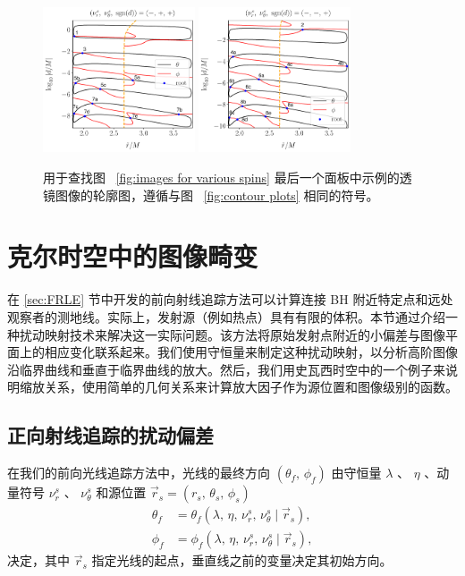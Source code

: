 \documentclass[aps,reprint,superscriptaddress,nofootinbib,floatfix,longbibliography,preprintnumbers]{revtex4-1}
\begin{document}
   \begin{figure}[!htbp]
    \centering
    \includegraphics[width=0.4\textwidth]{figures/80deg_contour_1.pdf}
    \includegraphics[width=0.4\textwidth]{figures/80deg_contour_2.pdf}
    \caption{用于查找图~    \ref{fig:images for various spins}    最后一个面板中示例的透镜图像的轮廓图，遵循与图~    \ref{fig:contour plots}    相同的符号。  }
    \label{fig:80deg contours}
\end{figure}    
   \section{克尔时空中的图像畸变  }    
   \label{sec:distortion}     

在    \ref{sec:FRLE}    节中开发的前向射线追踪方法可以计算连接 BH 附近特定点和远处观察者的测地线。实际上，发射源（例如热点）具有有限的体积。本节通过介绍一种扰动映射技术来解决这一实际问题。该方法将原始发射点附近的小偏差与图像平面上的相应变化联系起来。我们使用守恒量来制定这种扰动映射，以分析高阶图像沿临界曲线和垂直于临界曲线的放大。然后，我们用史瓦西时空中的一个例子来说明缩放关系，使用简单的几何关系来计算放大因子作为源位置和图像级别的函数。
   \subsection{正向射线追踪的扰动偏差  }     

在我们的前向光线追踪方法中，光线的最终方向    $(\theta_f,\,\phi_f)$    由守恒量    $\lambda$   、   $\eta$   、动量符号    $\nu_r^s$   、   $\nu_{\theta}^s$    和源位置    $\vec{r}_s = (r_s,\, \theta_s,\, \phi_s)$    
   \begin{equation}
\begin{aligned}
\theta_f&=\theta_f\left(\lambda,\,\eta,\,\nu_r^s,\,\nu_{\theta}^s \mid \vec{r}_s\right), \\ 
\phi_f&=\phi_f\left(\lambda,\,\eta,\,\nu_r^s,\,\nu_{\theta}^s \mid \vec{r}_s\right),
\end{aligned}
\end{equation}    决定，其中    $\vec{r}_s$    指定光线的起点，垂直线之前的变量决定其初始方向。  
\end{document}
